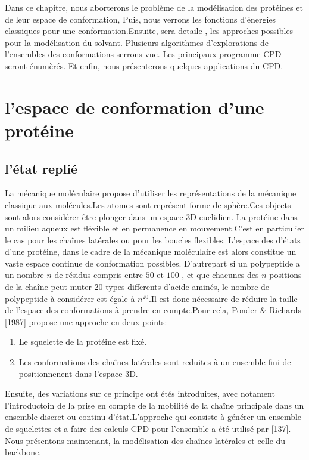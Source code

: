 Dans ce chapitre, nous aborterons le problème de la modélisation des protéines et de leur espace de conformation, Puis, nous verrons les fonctions d'énergies classiques pour une conformation.Ensuite, sera detaile , les approches possibles pour la modélisation du solvant. Plusieurs algorithmes d'explorations de l'ensembles des conformations serrons vue. Les principaux programme CPD seront énumèrés. Et enfin, nous présenterons quelques applications du CPD.   


\section{l'espace de conformation d'une protéine}

\subsection{l'état replié }
La mécanique moléculaire propose d'utiliser les représentations de la mécanique classique aux molécules.Les atomes sont représent forme de sphère.Ces objects sont alors considérer être plonger dans un espace 3D euclidien.
La protéine dans un milieu aqueux est fléxible et en permanence en mouvement.C'est en particulier le cas pour les chaînes latérales ou pour les boucles flexibles. L'espace des d'états d'une protéine, dans le cadre de la mécanique moléculaire est alors constitue un vaste espace continue de conformation possibles. D'autrepart si un polypeptide a un nombre $n$ de résidus compris entre $50$ et $100$ , et que chacunes des $n$ positions de la chaîne peut muter $20$ types differents d'acide aminés, le nombre de polypeptide à considérer est égale à  $n^{20}$.Il est donc nécessaire de réduire la taille de l'espace des conformations à prendre en compte.Pour cela, Ponder & Richards [1987] propose une approche en deux points:
\begin{enumerate}
\item Le squelette de la protéine est fixé.
\item Les conformations des chaînes latérales sont reduites à un ensemble fini de positionnenent dans l'espace 3D.
\end{enumerate}  
Ensuite, des variations sur ce principe ont étés introduites, avec notament l'introductoin de la prise en compte de la mobilité de la chaîne principale dans un ensemble discret ou continu d'état.L'approche qui consiste à générer un ensemble de squelettes et a faire des calculs CPD pour l'ensemble a été utilisé par [137]. 
Nous présentons maintenant, la modélisation des chaînes latérales et celle du backbone.

